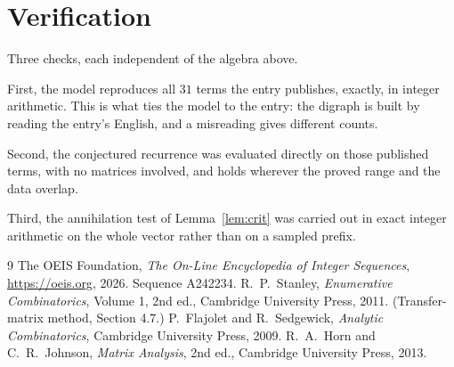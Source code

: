 \documentclass[11pt,a4paper]{article}
\theoremstyle{plain}
\theoremstyle{definition}
\begin{document}
\section{Verification}

Three checks, each independent of the algebra above.

First, the model reproduces all $31$ terms the entry publishes, exactly, in integer
arithmetic. This is what ties the model to the entry: the digraph is built by reading the
entry's English, and a misreading gives different counts.

Second, the conjectured recurrence was evaluated directly on those published terms, with no
matrices involved, and holds wherever the proved range and the data overlap.

Third, the annihilation test of Lemma~\ref{lem:crit} was carried out in exact integer
arithmetic on the whole vector rather than on a sampled prefix.

\begin{thebibliography}{9}
 The OEIS Foundation, \emph{The On-Line Encyclopedia of Integer
Sequences}, \url{https://oeis.org}, 2026. Sequence A242234.
 R.~P.~Stanley, \emph{Enumerative Combinatorics}, Volume 1, 2nd ed.,
Cambridge University Press, 2011. (Transfer-matrix method, Section 4.7.)
 P.~Flajolet and R.~Sedgewick, \emph{Analytic Combinatorics}, Cambridge
University Press, 2009.
 R.~A.~Horn and C.~R.~Johnson, \emph{Matrix Analysis}, 2nd ed., Cambridge
University Press, 2013.
\end{thebibliography}
\end{document}
